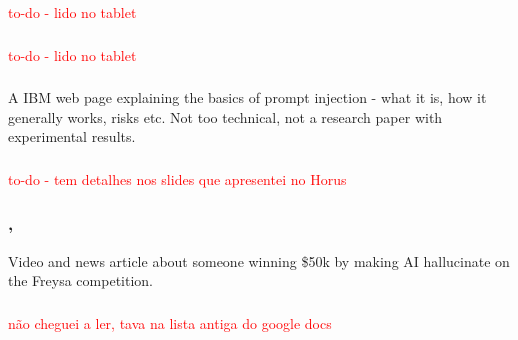 \documentclass[
  letterpaper,
  DIV=11,
  numbers=noendperiod]{scrartcl}
\begin{document}
\textcolor{red}{to-do - lido no tablet}

\subsubsection{\texorpdfstring{\autocite{BiscontiGPSSN26_AdversarialTales}}{{[}@BiscontiGPSSN26\_AdversarialTales{]}}}\label{biscontigpssn26_adversarialtales}

\textcolor{red}{to-do - lido no tablet}

\subsubsection{\texorpdfstring{\autocite{IBM2025_PromptInjection}}{{[}@IBM2025\_PromptInjection{]}}}\label{ibm2025_promptinjection}

A IBM web page explaining the basics of prompt injection - what it is,
how it generally works, risks etc. Not too technical, not a research
paper with experimental results.

\subsubsection{\texorpdfstring{\autocite{Alber2025_MedicalLLMsAreVulnerableToDataPoisoningAttacks}}{{[}@Alber2025\_MedicalLLMsAreVulnerableToDataPoisoningAttacks{]}}}\label{alber2025_medicalllmsarevulnerabletodatapoisoningattacks}

\textcolor{red}{to-do - tem detalhes nos slides que apresentei no Horus}

\subsubsection{\texorpdfstring{\autocite{Youtube2024_SomeoneWon50kByMakingAIHallucinate},\autocite{IlPost2024_Freysa}}{{[}@Youtube2024\_SomeoneWon50kByMakingAIHallucinate{]},{[}@IlPost2024\_Freysa{]}}}\label{youtube2024_someonewon50kbymakingaihallucinateilpost2024_freysa}

Video and news article about someone winning \$50k by making AI
hallucinate on the Freysa competition.

\subsubsection{\texorpdfstring{\autocite{HeidingKLKS24_LLMPhishing}}{{[}@HeidingKLKS24\_LLMPhishing{]}}}\label{heidingklks24_llmphishing}

\textcolor{red}{não cheguei a ler, tava na lista antiga do google docs}
\end{document}
